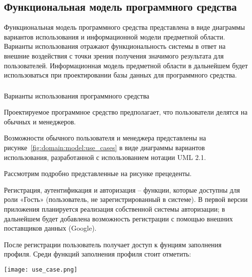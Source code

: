\subsection{Функциональная модель программного средства}
\label{sec:domain:model}

Функциональная модель программного средства представлена в виде диаграммы вариантов использования и информационной
модели предметной области. Варианты использования отражают функциональность системы в ответ на внешние воздействия с
точки зрения получения значимого результата для пользователей. Информационная модель предметной области в
дальнейшем будет использоваться при проектировании базы данных для программного средства.

\subsubsection{} Варианты использования программного средства
\label{sec:domain:model:use_cases}

Проектируемое программное средство предполагает, что пользователи делятся на обычных и менеджеров.

Возможности обычного пользователя и менеджера представлены на рисунке~\ref{fig:domain:model:use_cases} в виде
диаграммы вариантов использования, разработанной с использованием нотации UML 2.1.

Рассмотрим подробно представленные на рисунке прецеденты.

Регистрация, аутентификация и авторизация – функции, которые доступны для роли «Гость» (пользователь, не
зарегистрированный в системе). В первой версии приложения планируется реализация собственной системы авторизации; в
дальнейшем будет добавлена возможность регистрации с помощью внешних поставщиков данных (Google).

После регистрации пользователь получает доступ к фунциям заполнения профиля. Среди функций заполнения профиля стоит
отметить:

\begin{sidewaysfigure}
  \centering
    \texttt{[image: use\_case.png]} 
    \caption{Диаграмма вариантов использования ПС}
    \label{fig:domain:model:use_cases}
\end{sidewaysfigure}


